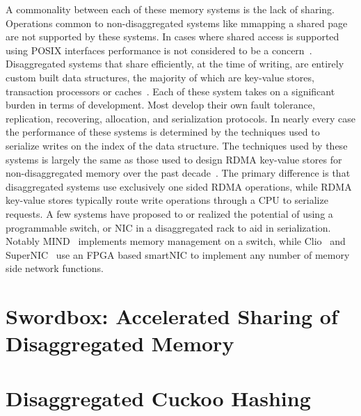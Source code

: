 \documentclass[12pt]{ucsddissertation}
\begin{document}
A commonality between each of these memory systems is the lack of sharing. Operations common to
non-disaggregated systems like mmapping a shared page are not supported by these systems. In cases
where shared access is supported using POSIX interfaces performance is not considered to be a
concern~\cite{Regions}. Disaggregated systems that share efficiently, at the time of writing, are
entirely custom built data structures, the majority of which are key-value stores, transaction
processors or caches~\cite{clover, sherman, race, fusee, rolex, ford, ditto}. Each of these system
takes on a significant burden in terms of development. Most develop their own fault tolerance,
replication, recovering, allocation, and serialization protocols. In nearly every case the
performance of these systems is determined by the techniques used to serialize writes on the index
of the data structure.
The techniques used by these systems is largely the same as those used to design RDMA key-value
stores for non-disaggregated memory over the past decade~\cite{pilaf,cell,herd,farm}. The primary
difference is that disaggregated systems use exclusively one sided RDMA operations, while RDMA
key-value stores typically route write operations through a CPU to serialize requests.
A few systems have proposed to or realized the potential of using a programmable switch, or NIC in a
disaggregated rack to aid in serialization. Notably MIND~\cite{mind} implements memory management on
a switch, while Clio~\cite{clio} and SuperNIC~\cite{supernic} use an FPGA based smartNIC to
implement any number of memory side network functions.





\chapter{Swordbox: Accelerated Sharing of Disaggregated Memory}
\label{chap:swordbox}










\chapter{Disaggregated Cuckoo Hashing}
\label{chap:rcuckoo}



%


%

\end{document}
